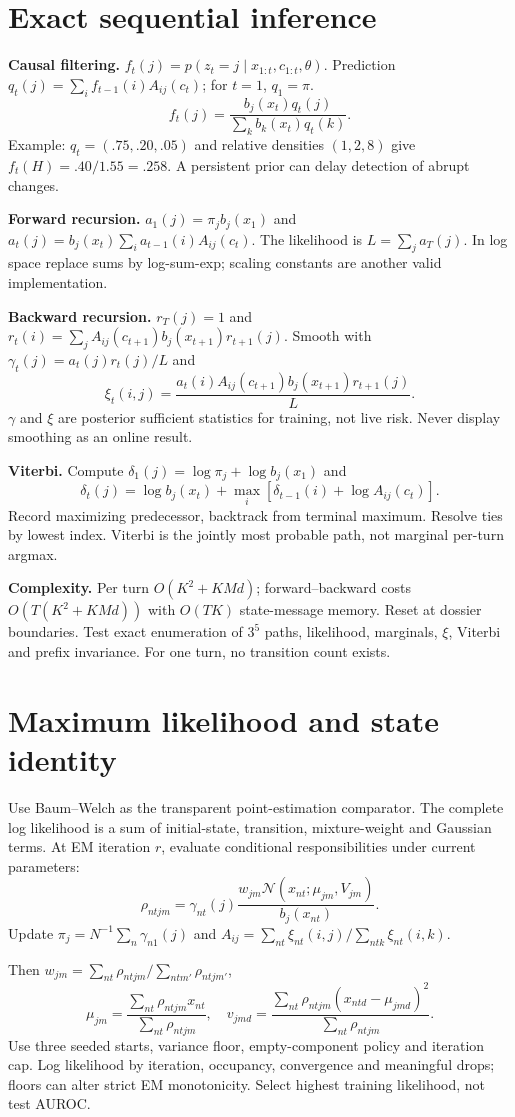 \documentclass[11pt,letterpaper]{article}
\newcommand{\sectionpage}[1]{\clearpage\section{#1}}
\begin{document}
\sectionpage{Exact sequential inference}
\textbf{Causal filtering.} $f_t(j)=p(z_t=j\mid x_{1:t},c_{1:t},\theta)$.
Prediction $q_t(j)=\sum_i f_{t-1}(i)A_{ij}(c_t)$; for $t=1$, $q_1=\pi$.
\[
f_t(j)=\frac{b_j(x_t)q_t(j)}{\sum_k b_k(x_t)q_t(k)}.
\]
Example: $q_t=(.75,.20,.05)$ and relative densities $(1,2,8)$ give $f_t(H)=.40/1.55=.258$. A persistent prior can delay detection of abrupt changes.

\textbf{Forward recursion.} $a_1(j)=\pi_j b_j(x_1)$ and
$a_t(j)=b_j(x_t)\sum_i a_{t-1}(i)A_{ij}(c_t)$.
The likelihood is $L=\sum_j a_T(j)$. In log space replace sums by log-sum-exp; scaling constants are another valid implementation.

\textbf{Backward recursion.} $r_T(j)=1$ and
$r_t(i)=\sum_jA_{ij}(c_{t+1})b_j(x_{t+1})r_{t+1}(j)$.
Smooth with $\gamma_t(j)=a_t(j)r_t(j)/L$ and
\[
\xi_t(i,j)=\frac{a_t(i)A_{ij}(c_{t+1})b_j(x_{t+1})r_{t+1}(j)}{L}.
\]
$\gamma$ and $\xi$ are posterior sufficient statistics for training, not live risk. Never display smoothing as an online result.

\textbf{Viterbi.} Compute $\delta_1(j)=\log\pi_j+\log b_j(x_1)$ and
\[
\delta_t(j)=\log b_j(x_t)+\max_i[\delta_{t-1}(i)+\log A_{ij}(c_t)].
\]
Record maximizing predecessor, backtrack from terminal maximum. Resolve ties by lowest index. Viterbi is the jointly most probable path, not marginal per-turn argmax.

\textbf{Complexity.} Per turn $O(K^2+KMd)$; forward--backward costs $O(T(K^2+KMd))$ with $O(TK)$ state-message memory. Reset at dossier boundaries. Test exact enumeration of $3^5$ paths, likelihood, marginals, $\xi$, Viterbi and prefix invariance. For one turn, no transition count exists.

\sectionpage{Maximum likelihood and state identity}
Use Baum--Welch as the transparent point-estimation comparator. The complete log likelihood is a sum of initial-state, transition, mixture-weight and Gaussian terms. At EM iteration $r$, evaluate conditional responsibilities under current parameters:
\[
\rho_{ntjm}=\gamma_{nt}(j)\frac{w_{jm}\mathcal N(x_{nt};\mu_{jm},V_{jm})}{b_j(x_{nt})}.
\]
Update $\pi_j=N^{-1}\sum_n\gamma_{n1}(j)$ and
$A_{ij}=\sum_{nt}\xi_{nt}(i,j)/\sum_{ntk}\xi_{nt}(i,k)$.
\par Then $w_{jm}=\sum_{nt}\rho_{ntjm}/\sum_{ntm'}\rho_{ntjm'}$,
\[
\mu_{jm}=\frac{\sum_{nt}\rho_{ntjm}x_{nt}}{\sum_{nt}\rho_{ntjm}},
\quad
v_{jmd}=\frac{\sum_{nt}\rho_{ntjm}(x_{ntd}-\mu_{jmd})^2}{\sum_{nt}\rho_{ntjm}}.
\]
Use three seeded starts, variance floor, empty-component policy and iteration cap. Log likelihood by iteration, occupancy, convergence and meaningful drops; floors can alter strict EM monotonicity. Select highest training likelihood, not test AUROC.
\end{document}
